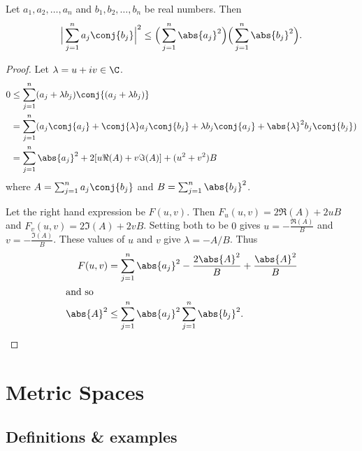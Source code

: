 \begin{theorem} \label{thm:C:cs}
    Let $a_1, a_2, \dots, a_n$ and $b_1, b_2, \dots, b_n$ be real numbers.
    Then \[
        \Big\lvert\sum_{j=1}^n a_j \conj{b_j}\Big\rvert^2
            \le \Big(\sum_{j=1}^n \abs{a_j}^2\Big)
                \Big(\sum_{j=1}^n \abs{b_j}^2\Big).
    \]
\end{theorem}
\begin{proof}
    Let $\lambda = u + iv \in \C$.
    \begin{align*}
        0 &\le \sum_{j=1}^n (a_j + \lambda b_j)\conj{(a_j + \lambda b_j)} \\
          &= \sum_{j=1}^n (a_j \conj{a_j} + \conj{\lambda} a_j \conj{b_j}
            + \lambda b_j \conj{a_j} + \abs{\lambda}^2 b_j \conj{b_j}) \\
          &= \sum_{j=1}^n \abs{a_j}^2 + 2[u \Re(A) + v \Im(A)]
            + (u^2 + v^2) B
    \end{align*}
    where $A = \sum_{j=1}^n a_j \conj{b_j}$ and
    $B = \sum_{j=1}^n \abs{b_j}^2$.

    Let the right hand expression be $F(u, v)$.
    Then $F_u(u, v) = 2\Re(A) + 2uB$ and $F_v(u, v) = 2\Im(A) + 2vB$.
    Setting both to be $0$ gives $u = -\frac{\Re(A)}{B}$ and
    $v = -\frac{\Im(A)}{B}$.
    These values of $u$ and $v$ give $\lambda = -A/B$.
    Thus \begin{align*}
        F(u, v) &= \sum_{j=1}^n \abs{a_j}^2 - \frac{2 \abs{A}^2}{B}
                    + \frac{\abs{A}^2}{B} \\
        \shortintertext{and so}
        \abs{A}^2 &\le \sum_{j=1}^n \abs{a_j}^2 \sum_{j=1}^n \abs{b_j}^2.
            \qedhere
    \end{align*}
\end{proof}

\chapter{Metric Spaces} \label{chp:metric}

\section{Definitions \& examples} \label{sec:defn}

